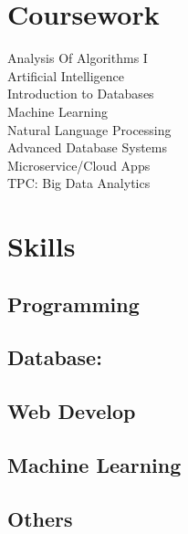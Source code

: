 \documentclass[]{junhu_resume}
\begin{document}
\begin{minipage}[t]{0.33\textwidth}

\section{Coursework}
Analysis Of Algorithms I\\
Artificial Intelligence\\
Introduction to Databases\\
Machine Learning\\
Natural Language Processing\\
Advanced Database Systems\\
Microservice/Cloud Apps\\
TPC: Big Data Analytics
\sectionsep


\section{Skills}
\subsection{Programming}
\sectionsep
\subsection{Database:}
\sectionsep
\subsection{Web Develop}
\sectionsep
\subsection{Machine Learning}
\sectionsep
\subsection{Others}
\sectionsep

%
%

\end{minipage} 
\end{document}

